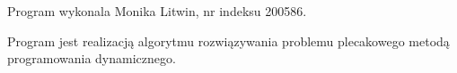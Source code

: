 \-Program wykonala \-Monika \-Litwin, nr indeksu 200586.

\-Program jest realizacją algorytmu rozwiązywania problemu plecakowego metodą programowania dynamicznego. 
